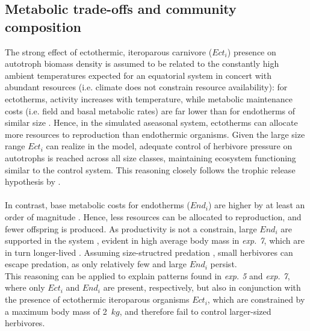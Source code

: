 \subsection{Metabolic trade-offs and community composition}
The strong effect of ectothermic, iteroparous carnivore ($Ect_i$) presence on autotroph biomass density is assumed to be related to the constantly high ambient temperatures expected for an equatorial system in concert with abundant resources (i.e. climate does not constrain resource availability): for ectotherms, activity increases with temperature, while metabolic maintenance costs (i.e. field and basal metabolic rates) are  far lower than for endotherms of similar size \citep{Nagy2005,Buckley2012}. 
Hence, in the simulated aseasonal system, ectotherms can allocate more resources to reproduction than endothermic organisms. 
Given the large size range $Ect_i$ can realize in the model,  adequate control of herbivore pressure on autotrophs is reached across all size classes, maintaining ecosystem functioning similar to the control system. 
This reasoning closely follows the trophic release hypothesis by \cite{Hairston1960}. 
\\\\
In contrast, base metabolic costs for endotherms ($End_i$) are higher by at least an order of magnitude \citep{Nagy2005}. 
Hence, less resources can be allocated to reproduction, and fewer offspring is produced. 
As productivity is not a constrain, large $End_i$ are supported in the system \citep{Smith2011}, evident in high average body mass in \textit{exp. 7}, which are in turn longer-lived \citep{Speakman2005}. 
Assuming size-structred predation \citep{Williams2010}, small herbivores can escape predation, as only relatively few and large $End_i$ persist. \\
This reasoning can be applied to explain patterns found in \textit{exp. 5} and \textit{exp. 7}, where only $Ect_i$ and $End_i$ are present, respectively, but also in conjunction with the presence of ectothermic iteroparous organisms  $Ect_i$, which are constrained by a maximum body mass of 2~$kg$, and therefore fail to control larger-sized herbivores. 




